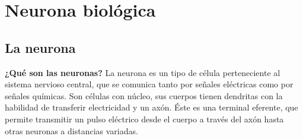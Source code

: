 \section{Neurona biológica}
\subsection{La neurona}

\textbf{¿Qué son las neuronas?} 
La neurona es un tipo de célula perteneciente al sistema nervioso central, que se comunica tanto por señales eléctricas como por señales químicas. Son células con núcleo, sus cuerpos tienen dendritas con la habilidad de transferir electricidad y un axón.  Éste es una terminal eferente, que permite transmitir un pulso eléctrico desde el cuerpo a través del axón hasta otras neuronas a distancias variadas.





